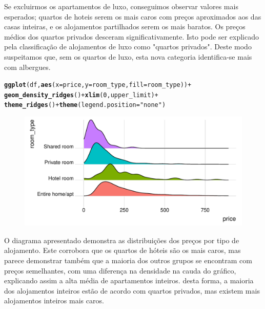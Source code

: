 \documentclass[justified, 11pt]{scrartcl}\usepackage[]{graphicx}\usepackage[]{xcolor}
\makeatletter
\def\maxwidth{ %
  \ifdim\Gin@nat@width>\linewidth
    \linewidth
  \else
    \Gin@nat@width
  \fi
}
\newcommand{\hlnum}[1]{\textcolor[rgb]{0.686,0.059,0.569}{#1}}%
\newcommand{\hlstr}[1]{\textcolor[rgb]{0.192,0.494,0.8}{#1}}%
\newcommand{\hlopt}[1]{\textcolor[rgb]{0,0,0}{#1}}%
\newcommand{\hlstd}[1]{\textcolor[rgb]{0.345,0.345,0.345}{#1}}%
\newcommand{\hlkwc}[1]{\textcolor[rgb]{0.333,0.667,0.333}{#1}}%
\newcommand{\hlkwd}[1]{\textcolor[rgb]{0.737,0.353,0.396}{\textbf{#1}}}%
\newenvironment{kframe}{%
 \def\at@end@of@kframe{}%
 \ifinner\ifhmode%
  \def\at@end@of@kframe{\end{minipage}}%
  \begin{minipage}{\columnwidth}%
 \fi\fi%
 \def\FrameCommand##1{\hskip\@totalleftmargin \hskip-\fboxsep
 \colorbox{shadecolor}{##1}\hskip-\fboxsep
     \hskip-\linewidth \hskip-\@totalleftmargin \hskip\columnwidth}%
 \MakeFramed {\advance\hsize-\width
   \@totalleftmargin\z@ \linewidth\hsize
   \@setminipage}}%
 {\par\unskip\endMakeFramed%
 \at@end@of@kframe}
\newenvironment{knitrout}{}{} %
\makeatother
\begin{document}
Se excluirmos os apartamentos de luxo, conseguimos observar valores mais esperados; quartos de hoteis serem os mais caros com preços aproximados aos das casas inteiras, e os alojamentos partilhados serem os mais baratos. Os preços médios dos quartos privados desceram significativamente. Isto pode ser explicado pela classificação de alojamentos de luxo como "quartos privados". Deste modo suspeitamos que, sem os quartos de luxo, esta nova categoria identifica-se mais com albergues.\\

\begin{knitrout}
\color{fgcolor}\begin{kframe}
\begin{alltt}
\hlkwd{ggplot}\hlstd{(df,} \hlkwd{aes}\hlstd{(}\hlkwc{x}\hlstd{=price,} \hlkwc{y}\hlstd{=room_type,} \hlkwc{fill}\hlstd{=room_type))} \hlopt{+}
  \hlkwd{geom_density_ridges}\hlstd{()} \hlopt{+} \hlkwd{xlim}\hlstd{(}\hlnum{0}\hlstd{, upper_limit)} \hlopt{+}
  \hlkwd{theme_ridges}\hlstd{()} \hlopt{+} \hlkwd{theme}\hlstd{(}\hlkwc{legend.position} \hlstd{=} \hlstr{"none"}\hlstd{)}
\end{alltt}


{\ttfamily\noindent\itshape\color{messagecolor}{\#\# Picking joint bandwidth of 24.6}}\end{kframe}\begin{figure}
\includegraphics[width=\maxwidth]{figure/chunk-RoomTypesPrice-1} \end{figure}

\end{knitrout}

O diagrama apresentado demonstra as distribuições dos preços por tipo de alojamento. Este corrobora que os quartos de hóteis são os mais caros, mas parece demonstrar também que a maioria dos outros grupos se encontram com preços semelhantes, com uma diferença na densidade na cauda do gráfico, explicando assim a alta média de apartamentos inteiros. desta forma, a maioria dos alojamentos inteiros estão de acordo com quartos privados, mas existem mais alojamentos inteiros mais caros.
\end{document}
